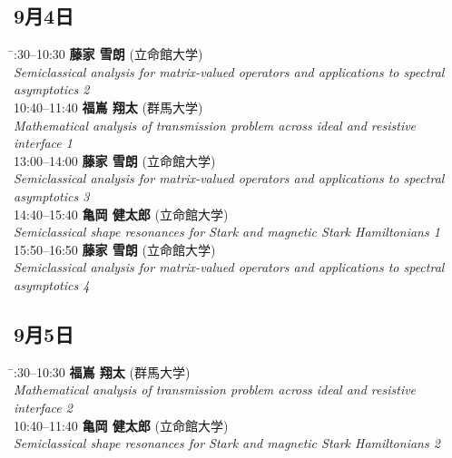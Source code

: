 \documentclass[a4paper,11pt]{article}
\numberwithin{equation}{section}
\begin{document}
\subsection*{9月4日}
\begin{tabbing}
  \hspace{3cm}\=:30--10:30 \> \textbf{藤家 雪朗}  (立命館大学)\\
                \> \emph{Semiclassical analysis for matrix-valued operators
and applications to spectral}\\
               \> \emph{ asymptotics 2}\\

  10:40--11:40 \> \textbf{福嶌 翔太}  (群馬大学)\\
                \> \emph{Mathematical analysis of transmission problem across ideal and resistive}\\
               \> \emph{ interface 1}\\

  13:00--14:00 \> \textbf{藤家 雪朗}  (立命館大学)\\
                \> \emph{Semiclassical analysis for matrix-valued operators
and applications to spectral}\\
               \> \emph{ asymptotics 3}\\

  14:40--15:40 \> \textbf{亀岡 健太郎}  (立命館大学)\\
                \> \emph{Semiclassical shape resonances for Stark and magnetic Stark Hamiltonians 1}\\
                
  15:50--16:50 \> \textbf{藤家 雪朗}  (立命館大学)\\
                \> \emph{Semiclassical analysis for matrix-valued operators
and applications to spectral}\\
               \> \emph{ asymptotics 4}
\end{tabbing}

\subsection*{9月5日}
\begin{tabbing}
  \hspace{3cm}\=:30--10:30 \> \textbf{福嶌 翔太}  (群馬大学)\\
                \> \emph{Mathematical analysis of transmission problem across ideal and resistive}\\
               \> \emph{ interface 2}\\

  10:40--11:40 \> \textbf{亀岡 健太郎}  (立命館大学)\\
                \> \emph{Semiclassical shape resonances for Stark and magnetic Stark Hamiltonians 2}
\end{tabbing}
\end{document}
